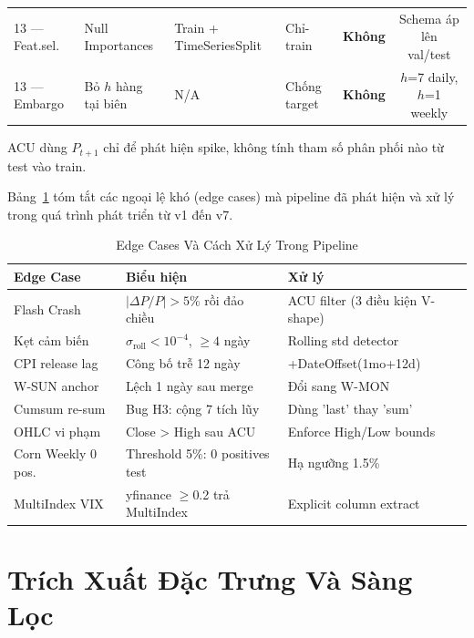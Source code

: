 \documentclass[conference]{IEEEtran}
\begin{document}
\begin{table}[htbp]
\begin{threeparttable}
\begin{tabular}{@{}llllcc@{}}
13 --- Feat.sel. & Null Importances          & Train + TimeSeriesSplit    & Chỉ-train    & \textbf{Không} & Schema áp lên val/test \\
13 --- Embargo   & Bỏ $h$ hàng tại biên     & N/A                        & Chống target & \textbf{Không} & $h$=7 daily, $h$=1 weekly \\
\bottomrule
\end{tabular}
\begin{tablenotes}
\footnotesize
\item[a] ACU dùng $P_{t+1}$ chỉ để phát hiện spike,
không tính tham số phân phối nào từ test vào train.
\end{tablenotes}
\end{threeparttable}
\end{table}

Bảng~\ref{tab:edge_cases} tóm tắt các ngoại lệ khó (edge cases) mà pipeline
đã phát hiện và xử lý trong quá trình phát triển từ v1 đến v7.

\begin{table}[htbp]
\caption{Edge Cases Và Cách Xử Lý Trong Pipeline}
\label{tab:edge_cases}
\centering
\begin{tabular}{@{}p{1.5cm}p{2.5cm}p{3.5cm}@{}}
\toprule
\textbf{Edge Case} & \textbf{Biểu hiện} & \textbf{Xử lý} \\
\midrule
Flash Crash & $|\Delta P/P| > 5\%$ rồi đảo chiều & ACU filter (3 điều kiện V-shape) \\
Kẹt cảm biến & $\sigma_\text{roll} < 10^{-4}$, $\geq 4$ ngày & Rolling std detector \\
CPI release lag & Công bố trễ 12 ngày & +DateOffset(1mo+12d) \\
W-SUN anchor & Lệch 1 ngày sau merge & Đổi sang W-MON \\
Cumsum re-sum & Bug H3: cộng 7 tích lũy & Dùng 'last' thay 'sum' \\
OHLC vi phạm & Close > High sau ACU & Enforce High/Low bounds \\
Corn Weekly 0 pos. & Threshold 5\%: 0 positives test & Hạ ngưỡng 1.5\% \\
MultiIndex VIX & yfinance $\geq$0.2 trả MultiIndex & Explicit column extract \\
\bottomrule
\end{tabular}
\end{table}

\section{Trích Xuất Đặc Trưng Và Sàng Lọc}
\end{document}
